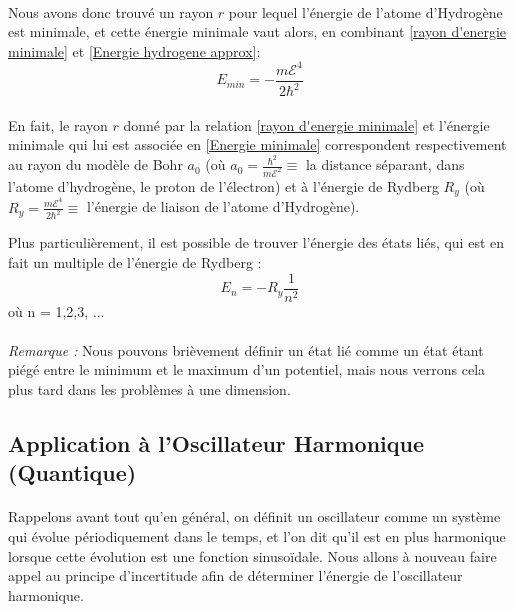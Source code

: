 \documentclass[../Notes de cours]{subfiles}
\begin{document}
\paragraph{} Nous avons donc trouvé un rayon $r$ pour lequel l'énergie de l'atome d'Hydrogène est minimale, et cette énergie minimale vaut alors, en combinant \ref{rayon d'energie minimale} et \ref{Energie hydrogene approx}: \begin{equation}
    \label{Energie minimale}
    E_{min} = - \frac{m\mathcal{E}^4}{2 \hbar^2}
\end{equation}

\paragraph{} En fait, le rayon $r$ donné par la relation \ref{rayon d'energie minimale} et l'énergie minimale qui lui est associée en \ref{Energie minimale} correspondent respectivement au rayon du modèle de Bohr $a_0$ (où $a_0 = \frac{\hbar^2}{m\mathcal{E}^2} \equiv$ la distance séparant, dans l'atome d'hydrogène, le proton de l'électron) et à l'énergie de Rydberg $R_y$ (où $R_y = \frac{m\mathcal{E}^4}{2\hbar^2} \equiv$ l'énergie de liaison de l'atome d'Hydrogène). 

Plus particulièrement, il est possible de trouver l'énergie des états liés, qui est en fait un multiple de l'énergie de Rydberg :
\begin{equation}
\label{Etats liés}
E_n = - R_y \frac{1}{n^2}
\end{equation}
où n = 1,2,3, ...

\paragraph{} \textit{Remarque :} Nous pouvons brièvement définir un état lié comme un état étant piégé entre le minimum et le maximum d'un potentiel, mais nous verrons cela plus tard dans les problèmes à une dimension. 

\subsection{Application à l'Oscillateur Harmonique (Quantique) }
\label{Application à l'Oscillateur Harmonique Quantique}

\paragraph{} Rappelons avant tout qu'en général, on définit un oscillateur comme un système qui évolue périodiquement dans le temps, et l'on dit qu'il est en plus harmonique lorsque cette évolution est une fonction sinusoïdale. 
\newline Nous allons à nouveau faire appel au principe d'incertitude afin de déterminer l'énergie de l'oscillateur harmonique. 
\end{document}
